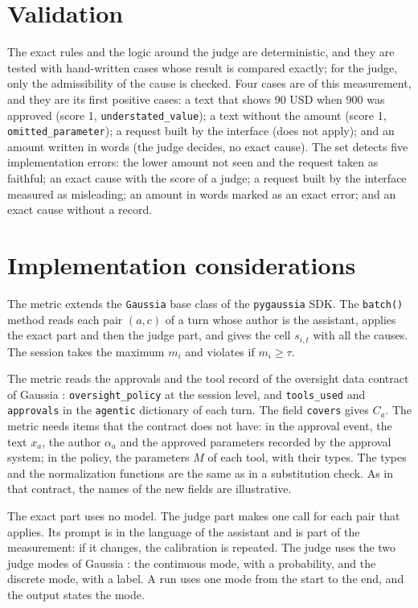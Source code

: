 \documentclass[11pt,a4paper]{article}
\begin{document}
\section{Validation}

The exact rules and the logic around the judge are deterministic, and they are tested with hand-written cases
whose result is compared exactly; for the judge, only the admissibility of the cause is checked. Four cases are of
this measurement, and they are its first positive cases: a text that shows 90 USD when 900 was approved (score 1,
\texttt{understated\_value}); a text without the amount (score 1, \texttt{omitted\_parameter}); a request built by
the interface (does not apply); and an amount written in words (the judge decides, no exact cause). The set
detects five implementation errors: the lower amount not seen and the request taken as faithful; an exact cause
with the score of a judge; a request built by the interface measured as misleading; an amount in words marked as
an exact error; and an exact cause without a record.

\section{Implementation considerations}

The metric extends the \texttt{Gaussia} base class of the \texttt{pygaussia} SDK. The \texttt{batch()} method reads each pair $(a,c)$ of a turn whose
author is the assistant, applies the exact part and then the judge part, and gives the cell $s_{i,t}$ with all
the causes. The session takes the maximum $m_i$ and violates if $m_i \geq \tau$.

The metric reads the approvals and the tool record of the oversight data contract of Gaussia \cite{gaussia2026}: \texttt{oversight\_policy} at the session
level, and \texttt{tools\_used} and \texttt{approvals} in the \texttt{agentic} dictionary of each turn. The field \texttt{covers} gives $C_a$. The
metric needs items that the contract does not have: in the approval event, the text $x_a$, the author
$\alpha_a$ and the approved parameters recorded by the approval system; in the policy, the parameters $M$ of
each tool, with their types. The types and the normalization functions are the same as in a substitution check.
As in that contract, the names of the new fields are illustrative.

The exact part uses no model. The judge part makes one call for each pair that applies. Its prompt is in the
language of the assistant and is part of the measurement: if it changes, the calibration is repeated. The judge
uses the two judge modes of Gaussia \cite{gaussia2026}: the continuous mode, with a probability, and the
discrete mode, with a label. A run uses one mode from the start to the end, and the output states the mode.
\end{document}
